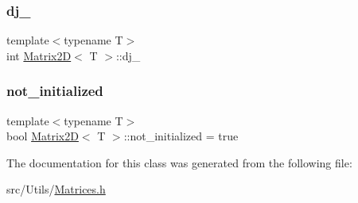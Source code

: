 \mbox{\label{classMatrix2D_a69fb005b681e8740654e28616560a780_a69fb005b681e8740654e28616560a780}} 
\subsubsection{\texorpdfstring{dj\+\_\+}{dj\_}}
{\footnotesize\ttfamily template$<$typename T$>$ \\
int \mbox{\hyperlink{classMatrix2D}{Matrix2D}}$<$ T $>$\+::dj\+\_\+\hspace{0.3cm}{\ttfamily [private]}}

\mbox{\label{classMatrix2D_a4138aec11153780128a8d93a3ef06576_a4138aec11153780128a8d93a3ef06576}} 
\subsubsection{\texorpdfstring{not\+\_\+initialized}{not\_initialized}}
{\footnotesize\ttfamily template$<$typename T$>$ \\
bool \mbox{\hyperlink{classMatrix2D}{Matrix2D}}$<$ T $>$\+::not\+\_\+initialized = true\hspace{0.3cm}{\ttfamily [private]}}



The documentation for this class was generated from the following file\+:\begin{DoxyCompactItemize}
\item 
src/\+Utils/\mbox{\hyperlink{Matrices_8h}{Matrices.\+h}}\end{DoxyCompactItemize}
